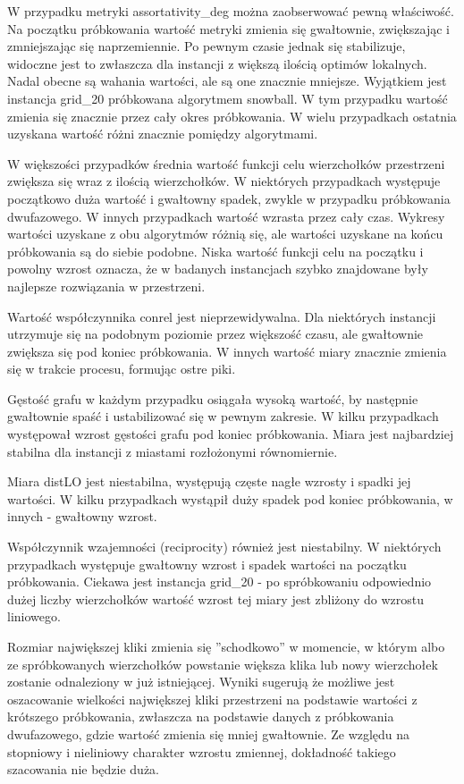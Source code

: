 W przypadku metryki assortativity\_deg można zaobserwować pewną właściwość.
Na początku próbkowania wartość metryki zmienia się gwałtownie, zwiększając i zmniejszając się naprzemiennie.
Po pewnym czasie jednak się stabilizuje, widoczne jest to zwłaszcza dla instancji z większą ilością optimów lokalnych.
Nadal obecne są wahania wartości, ale są one znacznie mniejsze.
Wyjątkiem jest instancja grid\_20 próbkowana algorytmem snowball.
W tym przypadku wartość zmienia się znacznie przez cały okres próbkowania.
W wielu przypadkach ostatnia uzyskana wartość różni znacznie pomiędzy algorytmami.

W większości przypadków średnia wartość funkcji celu wierzchołków przestrzeni zwiększa się wraz z ilością wierzchołków.
W niektórych przypadkach występuje początkowo duża wartość i gwałtowny spadek, zwykle w przypadku próbkowania dwufazowego.
W innych przypadkach wartość wzrasta przez cały czas.
Wykresy wartości uzyskane z obu algorytmów różnią się, ale wartości uzyskane na końcu próbkowania są do siebie podobne.
Niska wartość funkcji celu na początku i powolny wzrost oznacza, że w badanych instancjach szybko znajdowane były
najlepsze rozwiązania w przestrzeni.

Wartość współczynnika conrel jest nieprzewidywalna.
Dla niektórych instancji utrzymuje się na podobnym poziomie przez większość czasu,
ale gwałtownie zwiększa się pod koniec próbkowania.
W innych wartość miary znacznie zmienia się w trakcie procesu, formując ostre piki.

Gęstość grafu w każdym przypadku osiągała wysoką wartość, by następnie gwałtownie spaść i ustabilizować się w pewnym zakresie.
W kilku przypadkach występował wzrost gęstości grafu pod koniec próbkowania.
Miara jest najbardziej stabilna dla instancji z miastami rozłożonymi równomiernie.

Miara distLO jest niestabilna, występują częste nagłe wzrosty i spadki jej wartości.
W kilku przypadkach wystąpił duży spadek pod koniec próbkowania, w innych - gwałtowny wzrost.

Współczynnik wzajemności (reciprocity) również jest niestabilny.
W niektórych przypadkach występuje gwałtowny wzrost i spadek wartości na początku próbkowania.
Ciekawa jest instancja grid\_20 - po spróbkowaniu odpowiednio dużej liczby wierzchołków
wartość wzrost tej miary jest zbliżony do wzrostu liniowego.

Rozmiar największej kliki zmienia się ''schodkowo'' w momencie, w którym albo ze spróbkowanych wierzchołków
powstanie większa klika lub nowy wierzchołek zostanie odnaleziony w już istniejącej.
Wyniki sugerują że możliwe jest oszacowanie wielkości największej kliki przestrzeni na podstawie wartości
z krótszego próbkowania, zwłaszcza na podstawie danych z próbkowania dwufazowego, gdzie
wartość zmienia się mniej gwałtownie. Ze względu na stopniowy i nieliniowy charakter wzrostu zmiennej,
dokładność takiego szacowania nie będzie duża.

